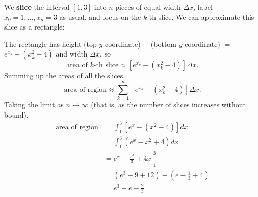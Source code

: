 \documentclass[main]{subfiles}
\begin{document}
\begin{enumerate}
  \begin{solution}
    We \textbf{slice} the interval $[1, 3]$ into $n$ pieces of equal width
    $\Delta x$, label $x_0 = 1, \ldots, x_n = 3$ as usual, and focus on
    the $k$-th slice.  We can approximate this slice as a rectangle:
    \begin{center}
    \end{center}
    The rectangle has height (top $y$-coordinate) $-$ (bottom
    $y$-coordinate) $=$ $e^{x_k} - (x_k^2 - 4)$ and width $\Delta x$,
    so
    \[ \text{area of $k$-th slice} \approx \left[ e^{x_k} - (x_k^2 - 4)
    \right] \Delta x.\]
    Summing up the areas of all the slices,
    \[ \text{area of region} \approx \sum_{k=1}^n \left[ e^{x_k} - (x_k^2 - 4)
    \right] \Delta x.\]
    Taking the limit as $n \to \infty$ (that is, as the number of slices
    increases without bound),
    \begin{align*}
      \text{area of region} &= \int_1^3 \left[ e^x - (x^2 - 4) \right]
      dx \\
      &= \int_1^3 \left( e^x - x^2 + 4 \right) dx \\
      &= \left. e^x - \frac{x^3}{3} + 4x \right|_1^3 \\
      &= \left( e^3 - 9 + 12 \right) - \left( e - \frac{1}{3} + 4 \right)
      \\
      &= \boxed{e^3 - e - \frac{2}{3}}
    \end{align*}
  \end{solution}


\end{enumerate}
\end{document}
